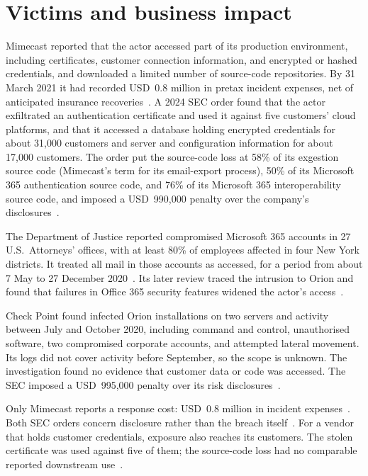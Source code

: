 \section{Victims and business impact}
\label{sec:victims}

Mimecast reported that the actor accessed part of its production environment, including certificates, customer connection information, and encrypted or hashed credentials, and downloaded a limited number of source-code repositories. By 31 March 2021 it had recorded USD~0.8 million in pretax incident expenses, net of anticipated insurance recoveries~\cite{mimecast-10k}. A 2024 SEC order found that the actor exfiltrated an authentication certificate and used it against five customers' cloud platforms, and that it accessed a database holding encrypted credentials for about 31,000 customers and server and configuration information for about 17,000 customers. The order put the source-code loss at 58\% of its exgestion source code (Mimecast's term for its email-export process), 50\% of its Microsoft 365 authentication source code, and 76\% of its Microsoft 365 interoperability source code, and imposed a USD~990,000 penalty over the company's disclosures~\cite{sec-mimecast}.

The Department of Justice reported compromised Microsoft 365 accounts in 27 U.S.\ Attorneys' offices, with at least 80\% of employees affected in four New York districts. It treated all mail in those accounts as accessed, for a period from about 7 May to 27 December 2020~\cite{doj-statement}. Its later review traced the intrusion to Orion and found that failures in Office 365 security features widened the actor's access~\cite{doj-review}.

Check Point found infected Orion installations on two servers and activity between July and October 2020, including command and control, unauthorised software, two compromised corporate accounts, and attempted lateral movement. Its logs did not cover activity before September, so the scope is unknown. The investigation found no evidence that customer data or code was accessed. The SEC imposed a USD~995,000 penalty over its risk disclosures~\cite{sec-checkpoint}.

Only Mimecast reports a response cost: USD~0.8 million in incident expenses~\cite{mimecast-10k}. Both SEC orders concern disclosure rather than the breach itself~\cite{sec-mimecast,sec-checkpoint}. For a vendor that holds customer credentials, exposure also reaches its customers. The stolen certificate was used against five of them; the source-code loss had no comparable reported downstream use~\cite{sec-mimecast}.
